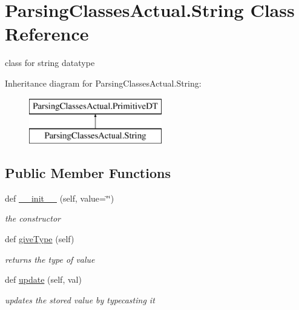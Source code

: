\hypertarget{class_parsing_classes_actual_1_1_string}{}\section{Parsing\+Classes\+Actual.\+String Class Reference}
\label{class_parsing_classes_actual_1_1_string}


class for string datatype  


Inheritance diagram for Parsing\+Classes\+Actual.\+String\+:\begin{figure}[H]
\begin{center}
\leavevmode
\includegraphics[height=2.000000cm]{class_parsing_classes_actual_1_1_string}
\end{center}
\end{figure}
\subsection*{Public Member Functions}
\begin{DoxyCompactItemize}
\item 
def \hyperlink{class_parsing_classes_actual_1_1_string_a8f97f0ea4e268f51804084ae84435c52}{\+\_\+\+\_\+init\+\_\+\+\_\+} (self, value=\textquotesingle{}\char`\"{}\char`\"{}\textquotesingle{})
\begin{DoxyCompactList}\small\item\em the constructor \end{DoxyCompactList}\item 
def \hyperlink{class_parsing_classes_actual_1_1_string_a292e4be2531c8eb3d6aa6f328defdad7}{give\+Type} (self)\hypertarget{class_parsing_classes_actual_1_1_string_a292e4be2531c8eb3d6aa6f328defdad7}{}\label{class_parsing_classes_actual_1_1_string_a292e4be2531c8eb3d6aa6f328defdad7}

\begin{DoxyCompactList}\small\item\em returns the type of value \end{DoxyCompactList}\item 
def \hyperlink{class_parsing_classes_actual_1_1_string_aa1f293f1e6aebb5522bb65ecfcce9051}{update} (self, val)\hypertarget{class_parsing_classes_actual_1_1_string_aa1f293f1e6aebb5522bb65ecfcce9051}{}\label{class_parsing_classes_actual_1_1_string_aa1f293f1e6aebb5522bb65ecfcce9051}

\begin{DoxyCompactList}\small\item\em updates the stored value by typecasting it \end{DoxyCompactList}\end{DoxyCompactItemize}
